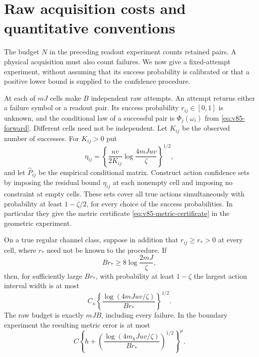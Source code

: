 \section{Raw acquisition costs and quantitative conventions}
\label{sec:v85-raw}
The budget $N$ in the preceding readout experiment counts retained
pairs. A physical acquisition must also count failures. We now give a
fixed-attempt experiment, without assuming that its success probability
is calibrated or that a positive lower bound is supplied to the
confidence procedure.

\begin{theorem}
\label{thm:v85-raw}
At each of $mJ$ cells make $B$ independent raw attempts. An attempt
returns either a failure symbol or a readout pair. Its success
probability $r_{ij}\in[0,1]$ is unknown, and the conditional law of a
successful pair is $\Phi_j(\omega_i)$ from
\eqref{eq:v85-forward}. Different cells need not be independent.
Let $K_{ij}$ be the observed number of successes. For $K_{ij}>0$ put
\begin{equation}\label{eq:v85-random-radius}
 \eta_{ij}=\left\{\frac{uv}{2K_{ij}}
                      \log\frac{4mJuv}{\zeta}\right\}^{1/2},
\end{equation}
and let $\widehat P_{ij}$ be the empirical conditional matrix.
Construct action confidence sets by imposing the residual bound
$\eta_{ij}$ at each nonempty cell and imposing no constraint at empty
cells. These sets cover all true actions simultaneously with probability
at least $1-\zeta/2$, for every choice of the success probabilities.
In particular they give the metric certificate
\eqref{eq:v85-metric-certificate} in the geometric experiment.

On a true regular channel class, suppose in addition that
$r_{ij}\ge r_*>0$ at every cell, where $r_*$ need not be known to the
procedure. If
\[
                     B r_*\ge8\log\frac{2mJ}{\zeta},
\]
then, for sufficiently large $B r_*$, with probability at least
$1-\zeta$ the largest action interval width is at most
\begin{equation}\label{eq:v85-raw-width}
                 C_\kappa\left\{
                  \frac{\log(4mJuv/\zeta)}{B r_*}\right\}^{1/2}.
\end{equation}
The raw budget is exactly $mJB$, including every failure. In the
boundary experiment the resulting metric error is at most
\begin{equation}\label{eq:v85-raw-metric}
 C\left\{h+
        \left(\frac{\log(4m_hJuv/\zeta)}{B r_*}\right)^{1/2}
                                                 \right\}^{\mu}.
\end{equation}
\end{theorem}

